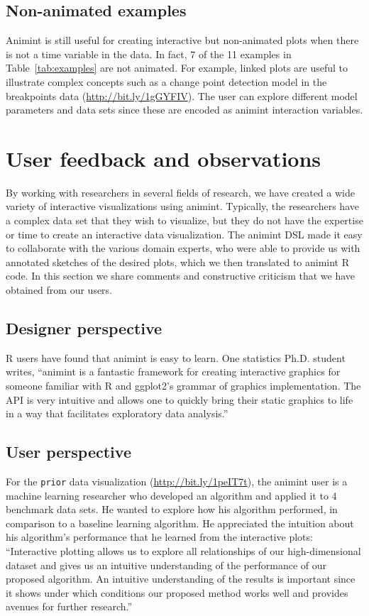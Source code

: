 \documentclass[journal]{vgtc}\usepackage[]{graphicx}\usepackage[]{color}
\begin{document}
\subsection{Non-animated examples}

Animint is still useful for creating interactive but
non-animated plots when there is not a time variable in the data.
In fact, 7 of the 11 examples in
Table~\ref{tab:examples} are not animated. For example, linked plots
are useful to illustrate complex concepts such as a change point
detection model in the breakpoints data
(\url{http://bit.ly/1gGYFIV}). The user can explore different model
parameters and data sets since these are encoded as animint
interaction variables.

\section{User feedback and observations}

By working with researchers in several fields of research,
we have created a wide variety of
interactive visualizations using animint.
Typically, the researchers have a complex data set that
they wish to visualize,
but they do not have the expertise or time to create
an interactive data visualization.
The animint DSL made it easy to collaborate with the various domain experts,
who were able to provide us with annotated sketches of the desired plots,
which we then translated to animint R code.
In this section we share comments and
constructive criticism that we have obtained from our users.

\subsection{Designer perspective}

R users have found that animint is easy to learn. One statistics
Ph.D. student writes, ``animint is a fantastic framework for creating
interactive graphics for someone familiar with R and ggplot2's grammar
of graphics implementation. The API is very intuitive and allows one
to quickly bring their static graphics to life in a way that
facilitates exploratory data analysis.''

\subsection{User perspective}

For the \texttt{prior} data visualization
(\url{http://bit.ly/1peIT7t}), the animint user is a machine learning
researcher who developed an algorithm and applied it to 4 benchmark
data sets. He wanted to explore how his algorithm performed, in
comparison to a baseline learning algorithm. He appreciated the
intuition about his algorithm's performance that he learned from the
interactive plots: ``Interactive plotting allows us to explore all
relationships of our high-dimensional dataset and gives us an
intuitive understanding of the performance of our proposed
algorithm. An intuitive understanding of the results is important
since it shows under which conditions our proposed method works well
and provides avenues for further research.''
\end{document}
